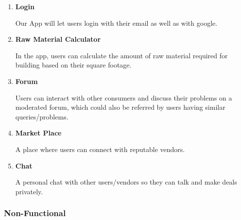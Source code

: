 \documentclass{article}
\begin{document}
\begin{enumerate}
      \item \textbf{Login}

            Our App will let users login with their email as well as with google.

      \item \textbf{Raw Material Calculator}
      
            In the app, users can calculate the amount of raw material required for building based on their square footage.

      \item \textbf{Forum}
      
            Users can interact with other consumers and discuss their problems on a moderated forum, which could also be referred by users having similar queries/problems.

      \item \textbf{Market Place}
      
            A place where users can connect with reputable vendors.

      \item \textbf{Chat}
      
            A personal chat with other users/vendors so they can talk and make deals privately.
\end{enumerate}

\subsubsection*{Non-Functional}
\end{document}
